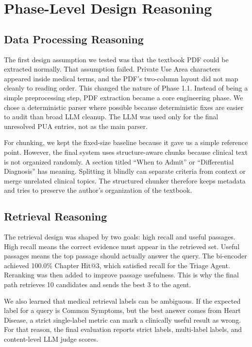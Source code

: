 \section{Phase-Level Design Reasoning}

\subsection{Data Processing Reasoning}

The first design assumption we tested was that the textbook PDF could be extracted normally. That assumption failed. Private Use Area characters appeared inside medical terms, and the PDF's two-column layout did not map cleanly to reading order. This changed the nature of Phase 1.1. Instead of being a simple preprocessing step, PDF extraction became a core engineering phase. We chose a deterministic parser where possible because deterministic fixes are easier to audit than broad LLM cleanup. The LLM was used only for the final unresolved PUA entries, not as the main parser.

For chunking, we kept the fixed-size baseline because it gave us a simple reference point. However, the final system uses structure-aware chunks because clinical text is not organized randomly. A section titled ``When to Admit'' or ``Differential Diagnosis'' has meaning. Splitting it blindly can separate criteria from context or merge unrelated clinical topics. The structured chunker therefore keeps metadata and tries to preserve the author's organization of the textbook.

\subsection{Retrieval Reasoning}

The retrieval design was shaped by two goals: high recall and useful passages. High recall means the correct evidence must appear in the retrieved set. Useful passages means the top passage should actually answer the query. The bi-encoder achieved 100.0\% Chapter Hit@3, which satisfied recall for the Triage Agent. Reranking was then added to improve passage usefulness. This is why the final path retrieves 10 candidates and sends the best 3 to the agent.

We also learned that medical retrieval labels can be ambiguous. If the expected label for a query is Common Symptoms, but the best answer comes from Heart Disease, a strict single-label metric can mark a clinically useful result as wrong. For that reason, the final evaluation reports strict labels, multi-label labels, and content-level LLM judge scores.

